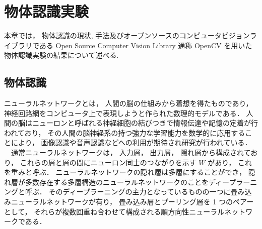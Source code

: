 \section{物体認識実験}
本章では，
物体認識の現状, 手法及びオープンソースのコンピュータビジョンライブラリである Open Source Computer Vision Library 通称 OpenCV を用いた物体認識実験の結果について述べる.


\subsection{物体認識}
ニューラルネットワークとは，
人間の脳の仕組みから着想を得たものであり，
神経回路網をコンピュータ上で表現しようと作られた数理的モデルである．
人間の脳はニューロンと呼ばれる神経細胞の結びつきで情報伝達や記憶の定着が行われており，
その人間の脳神経系の持つ強力な学習能力を数学的に応用することにより，
画像認識や音声認識などへの利用が期待され研究が行われている．\\
　通常ニューラルネットワークは，
入力層，
出力層，
隠れ層から構成されており，
これらの層と層の間にニューロン同士のつながりを示す $W$ があり，
これを重みと呼ぶ．
ニューラルネットワークの隠れ層は多層にすることができ，
隠れ層が多数存在する多層構造のニューラルネットワークのことをディープラーニングと呼ぶ．
そのディープラーニングの主力となっているものの一つに畳み込みニューラルネットワークが有り，
畳み込み層とプーリング層を 1 つのペアーとして，
それらが複数回重ね合わせて構成される順方向性ニューラルネットワークである．

